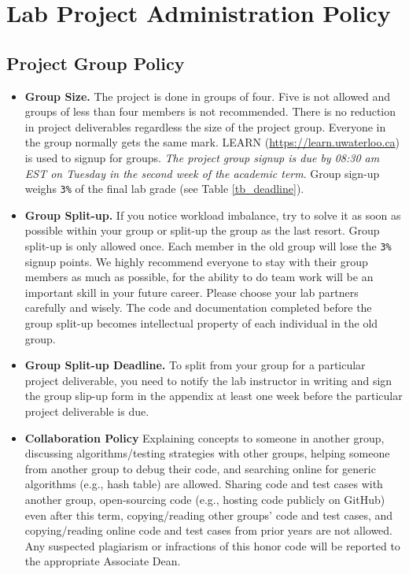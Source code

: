 \section*{Lab Project Administration Policy }

\subsection*{Project Group Policy}

\begin{itemize}
    \item {\bf Group Size.} The project is done in groups of four. 
        Five is not allowed and groups of less than four members is not recommended. 
        There is no reduction in project deliverables regardless the size of the project group. 
        Everyone in the group normally gets the same mark.
        LEARN (\url{https://learn.uwaterloo.ca}) is used to signup for groups. 
        {\em The project group signup is due by 08:30 am EST on Tuesday in the second week of
        the academic term}.
	Group sign-up weighs \verb+3%+ of the final lab grade (see Table \ref{tb_deadline}).
    \item {\bf Group Split-up.} 
        If you notice workload imbalance, try to solve it as soon as possible within your group or split-up the group as the last resort. 
        Group split-up is only allowed once. Each member in the old group will lose the \verb+3%+ signup points.
        We highly recommend everyone to stay with their group members as much as possible, for the ability to do team work will be an important skill in your future career.
        Please choose your lab partners carefully and wisely. 
        The code and documentation completed before the group split-up becomes intellectual property of each individual in the old group.
    \item {\bf Group Split-up Deadline.} 
        To split from your group for a particular project deliverable, 
        you need to notify the lab instructor in writing and 
        sign the group slip-up form in the appendix at least one week before the particular project deliverable is due.
    \item {\bf Collaboration Policy}
        Explaining concepts to someone in another group, discussing algorithms/testing strategies with other groups, helping someone from another group to debug their code, and searching online for generic algorithms (e.g., hash table) are allowed. 
        Sharing code and test cases with another group, open-sourcing code (e.g., hosting code publicly on GitHub) even after this term, copying/reading other groups' code and test cases, and copying/reading online code and test cases from prior years are not allowed. 
        Any suspected plagiarism or infractions of this honor code will be reported to the appropriate Associate Dean.
\end{itemize}
    

